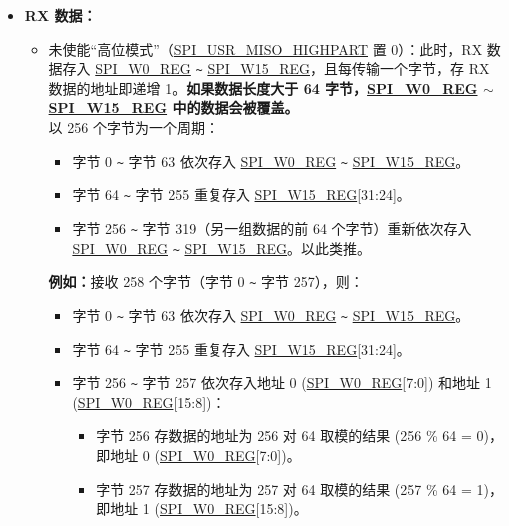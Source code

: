 \documentclass[main\_\_CN.tex]{subfiles}
\begin{document}
\begin{itemize}
\begin{itemize}
    \end{itemize}
    \item \textbf{RX 数据：}
    \begin{itemize}
        \item 未使能“高位模式”（\hyperref[fielddesc:SPIUSRMISOHIGHPART]{SPI\_USR\_MISO\_HIGHPART} 置 0）：此时，RX 数据存入 \hyperref[regdesc:SPIW0REG]{SPI\_W0\_REG} \verb+~+ \hyperref[regdesc:SPIW0REG]{SPI\_W15\_REG}，且每传输一个字节，存 RX 数据的地址即递增 1。\textbf{如果数据长度大于 64 字节，\hyperref[regdesc:SPIW0REG]{SPI\_W0\_REG} $\sim$ \hyperref[regdesc:SPIW0REG]{SPI\_W15\_REG} 中的数据会被覆盖。}\\
        以 256 个字节为一个周期：
        \begin{itemize}
            \item 字节 0 \verb+~+ 字节 63 依次存入 \hyperref[regdesc:SPIW0REG]{SPI\_W0\_REG} \verb+~+ \hyperref[regdesc:SPIW0REG]{SPI\_W15\_REG}。
            \item 字节 64 \verb+~+ 字节 255 重复存入 \hyperref[regdesc:SPIW0REG]{SPI\_W15\_REG}[31:24]。
            \item 字节 256 \verb+~+ 字节 319（另一组数据的前 64 个字节）重新依次存入 \hyperref[regdesc:SPIW0REG]{SPI\_W0\_REG} \verb+~+ \hyperref[regdesc:SPIW0REG]{SPI\_W15\_REG}。以此类推。
        \end{itemize}
        \textbf{例如：}接收 258 个字节（字节 0 \verb+~+ 字节 257），则：
        \begin{itemize}
            \item 字节 0 \verb+~+ 字节 63 依次存入 \hyperref[regdesc:SPIW0REG]{SPI\_W0\_REG} \verb+~+ \hyperref[regdesc:SPIW0REG]{SPI\_W15\_REG}。
            \item 字节 64 \verb+~+ 字节 255 重复存入 \hyperref[regdesc:SPIW0REG]{SPI\_W15\_REG}[31:24]。
            \item 字节 256 \verb+~+ 字节 257 依次存入地址 0 (\hyperref[regdesc:SPIW0REG]{SPI\_W0\_REG}[7:0]) 和地址 1 (\hyperref[regdesc:SPIW0REG]{SPI\_W0\_REG}[15:8])：
            \begin{itemize}
                \item 字节 256 存数据的地址为 256 对 64 取模的结果 (256 \% 64 = 0)，即地址 0 (\hyperref[regdesc:SPIW0REG]{SPI\_W0\_REG}[7:0])。
                \item 字节 257 存数据的地址为 257 对 64 取模的结果 (257 \% 64 = 1)，即地址 1 (\hyperref[regdesc:SPIW0REG]{SPI\_W0\_REG}[15:8])。
            \end{itemize}
        \end{itemize}


\end{itemize}
\end{itemize}
\end{document}
